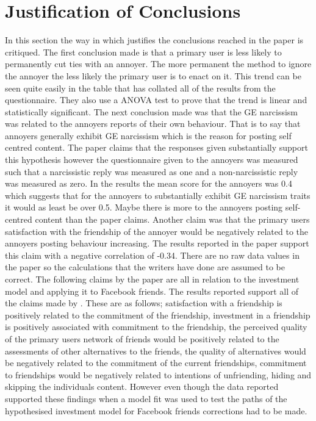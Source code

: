 \documentclass[12pt]{article}
\begin{document}
\section{Justification of Conclusions}
In this section the way in which \cite{Carpenter} justifies the conclusions reached in the paper is critiqued. The first conclusion made is that a primary user is less likely to permanently cut ties with an annoyer. The more permanent the method to ignore the annoyer the less likely the primary user is to enact on it. This trend can be seen quite easily in the table that has collated all of the results from the questionnaire. They also use a ANOVA test to prove that the trend is linear and statistically significant. 
The next conclusion made was that the GE narcissism was related to the annoyers reports of their own behaviour. That is to say that annoyers generally exhibit GE narcissism which is the reason for posting self centred content. The paper claims that the responses given substantially support this hypothesis however the questionnaire given to the annoyers was measured such that a narcissistic reply was measured as one and a non-narcissistic reply was measured as zero. In the results the mean score for the annoyers was 0.4 which suggests that for the annoyers to substantially exhibit GE narcissism traits it would as least be over 0.5. Maybe there is more to the annoyers posting self-centred content than the paper claims. 
Another claim was that the primary users satisfaction with the friendship of the annoyer would be negatively related to the annoyers posting behaviour increasing. The results reported in the paper support this claim with a negative correlation of -0.34. There are no raw data values in the paper so the calculations that the writers have done are assumed to be correct.
The following claims by the paper are all in relation to the investment model and applying it to Facebook friends. The results reported support all of the claims made by \cite{Carpenter}. These are as follows; satisfaction with a friendship is positively related to the commitment of the friendship, investment in a friendship is positively associated with commitment to the friendship, the perceived quality of the primary users network of friends would be positively related to the assessments of other alternatives to the friends, the quality of alternatives would be negatively related to the commitment of the current friendships, commitment to friendships would be negatively related to intentions of unfriending, hiding and skipping the individuals content. 
However even though the data reported supported these findings when a model fit was used to test the paths of the hypothesised investment model for Facebook friends corrections had to be made. 
\end{document}
